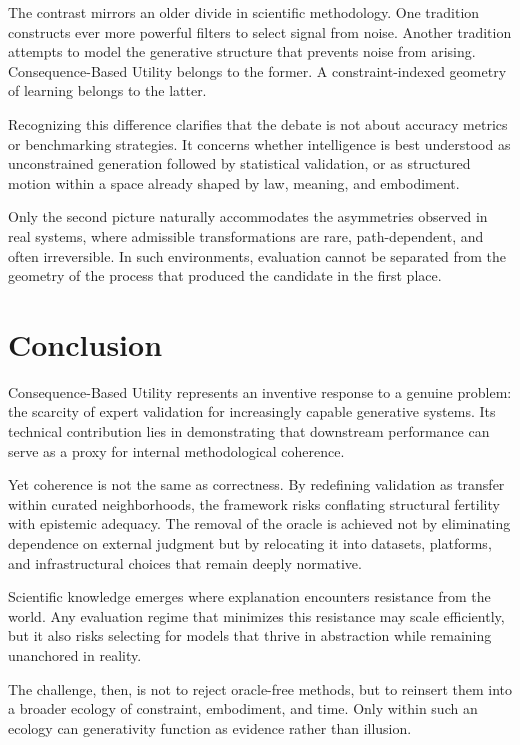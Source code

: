 \documentclass[12pt]{article}
\begin{document}
The contrast mirrors an older divide in scientific methodology. One tradition constructs ever more powerful filters to select signal from noise. Another tradition attempts to model the generative structure that prevents noise from arising. Consequence-Based Utility belongs to the former. A constraint-indexed geometry of learning belongs to the latter.

Recognizing this difference clarifies that the debate is not about accuracy metrics or benchmarking strategies. It concerns whether intelligence is best understood as unconstrained generation followed by statistical validation, or as structured motion within a space already shaped by law, meaning, and embodiment.

Only the second picture naturally accommodates the asymmetries observed in real systems, where admissible transformations are rare, path-dependent, and often irreversible. In such environments, evaluation cannot be separated from the geometry of the process that produced the candidate in the first place.


\section{Conclusion}

Consequence-Based Utility represents an inventive response to a genuine problem: the scarcity of expert validation for increasingly capable generative systems. Its technical contribution lies in demonstrating that downstream performance can serve as a proxy for internal methodological coherence.

Yet coherence is not the same as correctness. By redefining validation as transfer within curated neighborhoods, the framework risks conflating structural fertility with epistemic adequacy. The removal of the oracle is achieved not by eliminating dependence on external judgment but by relocating it into datasets, platforms, and infrastructural choices that remain deeply normative.

Scientific knowledge emerges where explanation encounters resistance from the world. Any evaluation regime that minimizes this resistance may scale efficiently, but it also risks selecting for models that thrive in abstraction while remaining unanchored in reality.

The challenge, then, is not to reject oracle-free methods, but to reinsert them into a broader ecology of constraint, embodiment, and time. Only within such an ecology can generativity function as evidence rather than illusion.
\end{document}
